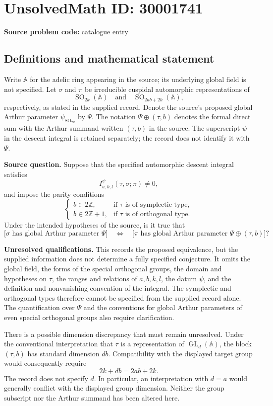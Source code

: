 \documentclass[11pt]{article}
\begin{document}
\section*{UnsolvedMath ID: 30001741}
\textbf{Source problem code:} catalogue entry
\subsection{Definitions and mathematical statement}
Write \(\mathbb A\) for the adelic ring appearing in the source; its underlying global field is not specified. Let \(\sigma\) and \(\pi\) be irreducible cuspidal automorphic representations of
\[
\operatorname{SO}_{2k}(\mathbb A)
\quad\text{and}\quad
\operatorname{SO}_{2ab+2k}(\mathbb A),
\]
respectively, as stated in the supplied record. Denote the source's proposed global Arthur parameter \(\psi_{\operatorname{SO}_{2k}}\) by \(\Psi\). The notation \(\Psi\oplus(\tau,b)\) denotes the formal direct sum with the Arthur summand written \((\tau,b)\) in the source. The superscript \(\psi\) in the descent integral is retained separately; the record does not identify it with \(\Psi\).

\textbf{Source question.} Suppose that the specified automorphic descent integral satisfies
\[
I_{a,k,l}^{\psi}(\tau,\sigma;\pi)\ne 0,
\]
and impose the parity conditions
\[
\begin{cases}
b\in 2\mathbb Z,&\text{if \(\tau\) is of symplectic type},\\
b\in 2\mathbb Z+1,&\text{if \(\tau\) is of orthogonal type}.
\end{cases}
\]
Under the intended hypotheses of the source, is it true that
\[
\bigl[\sigma\text{ has global Arthur parameter }\Psi\bigr]
\quad\Longleftrightarrow\quad
\bigl[\pi\text{ has global Arthur parameter }\Psi\oplus(\tau,b)\bigr]?
\]

\textbf{Unresolved qualifications.} This records the proposed equivalence, but the supplied information does not determine a fully specified conjecture. It omits the global field, the forms of the special orthogonal groups, the domain and hypotheses on \(\tau\), the ranges and relations of \(a,b,k,l\), the datum \(\psi\), and the definition and nonvanishing convention of the integral. The symplectic and orthogonal types therefore cannot be specified from the supplied record alone. The quantification over \(\Psi\) and the conventions for global Arthur parameters of even special orthogonal groups also require clarification.

There is a possible dimension discrepancy that must remain unresolved. Under the conventional interpretation that \(\tau\) is a representation of \(\operatorname{GL}_{d}(\mathbb A)\), the block \((\tau,b)\) has standard dimension \(db\). Compatibility with the displayed target group would consequently require
\[
2k+db=2ab+2k.
\]
The record does not specify \(d\). In particular, an interpretation with \(d=a\) would generally conflict with the displayed group dimension. Neither the group subscript nor the Arthur summand has been altered here.
\end{document}
